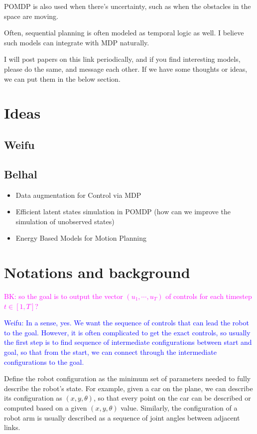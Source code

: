 \documentclass{article}
\begin{document}
POMDP is also used when there's uncertainty, such as when the obstacles in the space are moving. 

Often, sequential planning is often modeled as temporal logic as well. I believe such models can integrate with MDP naturally. 

I will post papers on this link periodically, and if you find interesting models, please do the same, and message each other. If we have some thoughts or ideas, we can put them in the below section. 



\section{Ideas}

\subsection{Weifu}

\subsection{Belhal}
\begin{itemize}
\item Data augmentation for Control via MDP
\item Efficient latent states simulation in POMDP (how can we improve the simulation of unobserved states)
\item Energy Based Models for Motion Planning
\end{itemize}


\section{Notations and background}



\textcolor{magenta}{BK: so the goal is to output the vector $(u_1, \cdots, u_T)$ of controls for each timestep $t \in [1, T]$?}

\textcolor{blue}{Weifu: In a sense, yes. We want the sequence of controls that can lead the robot to the goal. However, it is often complicated to get the exact controls, so usually the first step is to find sequence of intermediate configurations between start and goal, so that from the start, we can connect through the intermediate configurations to the goal. }

Define the robot configuration as the minimum set of parameters needed to fully describe the robot's state. For example, given a car on the plane, we can describe its configuration as $(x, y, \theta)$, so that every point on the car can be described or computed based on a given $(x, y, \theta)$ value. Similarly, the configuration of a robot arm is usually described as a sequence of joint angles between adjacent links. 
\end{document}
